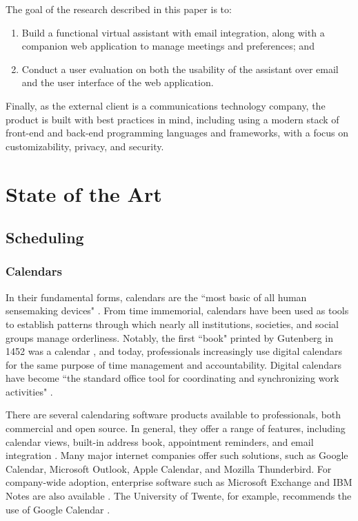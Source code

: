 \documentclass{article}
\begin{document}
The goal of the research described in this paper is to:

\begin{enumerate}
	\item Build a functional virtual assistant with email integration, along with a companion web application to manage meetings and preferences; and
	\item Conduct a user evaluation on both the usability of the assistant over email and the user interface of the web application.
\end{enumerate}

Finally, as the external client is a communications technology company, the product is built with best practices in mind, including using a modern stack of front-end and back-end programming languages and frameworks, with a focus on customizability, privacy, and security.

\newpage

\section{State of the Art}

\subsection{Scheduling}

\subsubsection{Calendars}

In their fundamental forms, calendars are the ``most basic of all human sensemaking devices" \cite{wajcman_digital_2019}. From time immemorial, calendars have been used as tools to establish patterns through which nearly all institutions, societies, and social groups manage orderliness. Notably, the first ``book" printed by Gutenberg in 1452 was a calendar \cite{editors_printing_nodate}, and today, professionals increasingly use digital calendars for the same purpose of time management and accountability. Digital calendars have become ``the standard office tool for coordinating and synchronizing work activities" \cite{wajcman_digital_2019}.

There are several calendaring software products available to professionals, both commercial and open source. In general, they offer a range of features, including calendar views, built-in address book, appointment reminders, and email integration \cite{noauthor_top_2019}. Many major internet companies offer such solutions, such as Google Calendar, Microsoft Outlook, Apple Calendar, and Mozilla Thunderbird. For company-wide adoption, enterprise software such as Microsoft Exchange and IBM Notes are also available \cite{masli_design_2011}. The University of Twente, for example, recommends the use of Google Calendar \cite{noauthor_home_nodate}.
\end{document}
